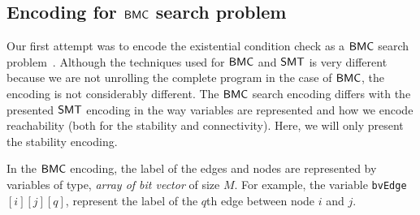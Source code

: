 \subsection{Encoding for $\mathsf{BMC}$ search problem}

Our first attempt was to encode the existential condition check as a $\mathsf{BMC}$ search problem~\cite{shukla2017discovering}.
%
%
Although the techniques used for $\mathsf{BMC}$ and $\mathsf{SMT}$ is very different because we are not unrolling the complete program in the case of $\mathsf{BMC}$, the encoding is not considerably different.
% 
The $\mathsf{BMC}$ search encoding differs with the presented $\mathsf{SMT}$ encoding in the way variables are represented and how we encode reachability (both for the stability and connectivity).  
%
Here, we will only present the stability encoding.


In the $\mathsf{BMC}$ encoding, the label of the edges and nodes are represented by variables of type, \textit{array of bit vector} of size $M$. 
%
For example, the variable \texttt{bvEdge}$[i][j][q]$, represent the label of the $q$th edge between node $i$ and $j$.

